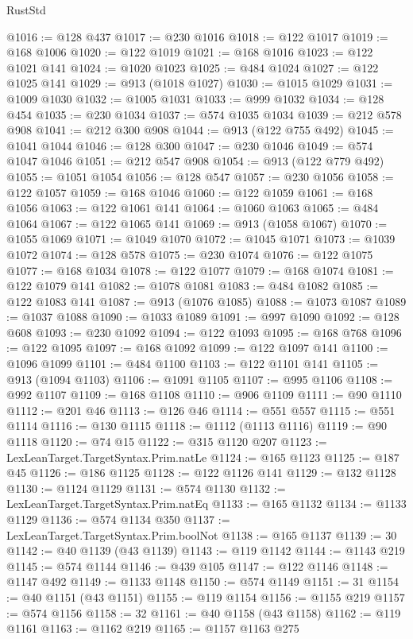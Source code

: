 \begin{lexlean}{RustStd}
\begin{coremodule}
@1016 := @128 @437
@1017 := @230 @1016
@1018 := @122 @1017
@1019 := @168 @1006
@1020 := @122 @1019
@1021 := @168 @1016
@1023 := @122 @1021 @141
@1024 := @1020 @1023
@1025 := @484 @1024
@1027 := @122 @1025 @141
@1029 := @913 (@1018 @1027)
@1030 := @1015 @1029
@1031 := @1009 @1030
@1032 := @1005 @1031
@1033 := @999 @1032
@1034 := @128 @454
@1035 := @230 @1034
@1037 := @574 @1035 @1034
@1039 := @212 @578 @908
@1041 := @212 @300 @908
@1044 := @913 (@122 @755 @492)
@1045 := @1041 @1044
@1046 := @128 @300
@1047 := @230 @1046
@1049 := @574 @1047 @1046
@1051 := @212 @547 @908
@1054 := @913 (@122 @779 @492)
@1055 := @1051 @1054
@1056 := @128 @547
@1057 := @230 @1056
@1058 := @122 @1057
@1059 := @168 @1046
@1060 := @122 @1059
@1061 := @168 @1056
@1063 := @122 @1061 @141
@1064 := @1060 @1063
@1065 := @484 @1064
@1067 := @122 @1065 @141
@1069 := @913 (@1058 @1067)
@1070 := @1055 @1069
@1071 := @1049 @1070
@1072 := @1045 @1071
@1073 := @1039 @1072
@1074 := @128 @578
@1075 := @230 @1074
@1076 := @122 @1075
@1077 := @168 @1034
@1078 := @122 @1077
@1079 := @168 @1074
@1081 := @122 @1079 @141
@1082 := @1078 @1081
@1083 := @484 @1082
@1085 := @122 @1083 @141
@1087 := @913 (@1076 @1085)
@1088 := @1073 @1087
@1089 := @1037 @1088
@1090 := @1033 @1089
@1091 := @997 @1090
@1092 := @128 @608
@1093 := @230 @1092
@1094 := @122 @1093
@1095 := @168 @768
@1096 := @122 @1095
@1097 := @168 @1092
@1099 := @122 @1097 @141
@1100 := @1096 @1099
@1101 := @484 @1100
@1103 := @122 @1101 @141
@1105 := @913 (@1094 @1103)
@1106 := @1091 @1105
@1107 := @995 @1106
@1108 := @992 @1107
@1109 := @168 @1108
@1110 := @906 @1109
@1111 := @90 @1110
@1112 := @201 @46
@1113 := @126 @46
@1114 := @551 @557
@1115 := @551 @1114
@1116 := @130 @1115
@1118 := @1112 (@1113 @1116)
@1119 := @90 @1118
@1120 := @74 @15
@1122 := @315 @1120 @207
@1123 := LexLeanTarget.TargetSyntax.Prim.natLe
@1124 := @165 @1123
@1125 := @187 @45
@1126 := @186 @1125
@1128 := @122 @1126 @141
@1129 := @132 @1128
@1130 := @1124 @1129
@1131 := @574 @1130
@1132 := LexLeanTarget.TargetSyntax.Prim.natEq
@1133 := @165 @1132
@1134 := @1133 @1129
@1136 := @574 @1134 @350
@1137 := LexLeanTarget.TargetSyntax.Prim.boolNot
@1138 := @165 @1137
@1139 := 30
@1142 := @40 @1139 (@43 @1139)
@1143 := @119 @1142
@1144 := @1143 @219
@1145 := @574 @1144
@1146 := @439 @105
@1147 := @122 @1146
@1148 := @1147 @492
@1149 := @1133 @1148
@1150 := @574 @1149
@1151 := 31
@1154 := @40 @1151 (@43 @1151)
@1155 := @119 @1154
@1156 := @1155 @219
@1157 := @574 @1156
@1158 := 32
@1161 := @40 @1158 (@43 @1158)
@1162 := @119 @1161
@1163 := @1162 @219
@1165 := @1157 @1163 @275

\end{coremodule}
\end{lexlean}
